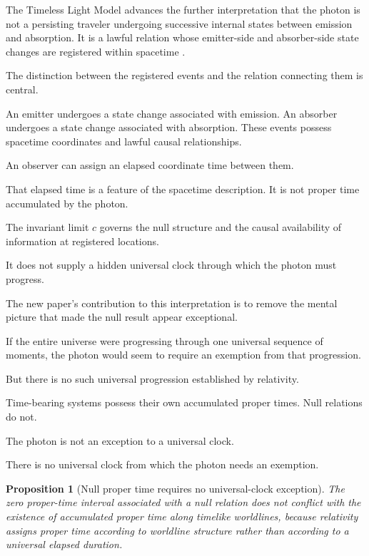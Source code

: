 \documentclass[12pt,onecolumn]{article}
\newtheorem{proposition}{Proposition}[section]
\begin{document}
The Timeless Light Model advances the further interpretation that the photon is not a persisting traveler undergoing successive internal states between emission and absorption. It is a lawful relation whose emitter-side and absorber-side state changes are registered within spacetime \cite{NullProperTime,UnifiedPhysics,EndpointsTimed}.

The distinction between the registered events and the relation connecting them is central.

An emitter undergoes a state change associated with emission. An absorber undergoes a state change associated with absorption. These events possess spacetime coordinates and lawful causal relationships.

An observer can assign an elapsed coordinate time between them.

That elapsed time is a feature of the spacetime description. It is not proper time accumulated by the photon.

The invariant limit \(c\) governs the null structure and the causal availability of information at registered locations.

It does not supply a hidden universal clock through which the photon must progress.

The new paper's contribution to this interpretation is to remove the mental picture that made the null result appear exceptional.

If the entire universe were progressing through one universal sequence of moments, the photon would seem to require an exemption from that progression.

But there is no such universal progression established by relativity.

Time-bearing systems possess their own accumulated proper times. Null relations do not.

The photon is not an exception to a universal clock.

There is no universal clock from which the photon needs an exemption.

\begin{proposition}[Null proper time requires no universal-clock exception]

The zero proper-time interval associated with a null relation does not conflict with the existence of accumulated proper time along timelike worldlines, because relativity assigns proper time according to worldline structure rather than according to a universal elapsed duration.

\end{proposition}
\end{document}
